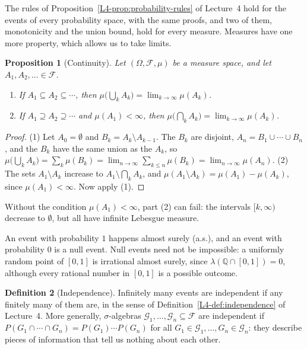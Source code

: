 \documentclass[11pt]{article}
\theoremstyle{definition}
\newtheorem{definition}{Definition}[section]
\theoremstyle{plain}
\newtheorem{proposition}[definition]{Proposition}
\theoremstyle{remark}
\begin{document}
The rules of Proposition~\ref{L4-prop:probability-rules} of Lecture~4 hold for the events of every probability space, with the same proofs, and two of them, monotonicity and the union bound, hold for every measure. Measures have one more property, which allows us to take limits.

\begin{proposition}[Continuity]\label{prop:continuity}
    Let $(\Omega, \mathcal{F}, \mu)$ be a measure space, and let $A_1, A_2, \ldots \in \mathcal{F}$.
    \begin{enumerate}
        \item If $A_1 \subseteq A_2 \subseteq \cdots$, then $\mu\big(\bigcup_k A_k\big) = \lim_{k \to \infty} \mu(A_k)$.
        \item If $A_1 \supseteq A_2 \supseteq \cdots$ and $\mu(A_1) < \infty$, then $\mu\big(\bigcap_k A_k\big) = \lim_{k \to \infty} \mu(A_k)$.
    \end{enumerate}
\end{proposition}

\begin{proof}
    (1) Let $A_0 = \emptyset$ and $B_k = A_k \setminus A_{k-1}$. The $B_k$ are disjoint, $A_n = B_1 \cup \cdots \cup B_n$, and the $B_k$ have the same union as the $A_k$, so $\mu\big(\bigcup_k A_k\big) = \sum_k \mu(B_k) = \lim_{n \to \infty}\sum_{k \leq n} \mu(B_k) = \lim_{n \to \infty} \mu(A_n)$. (2) The sets $A_1 \setminus A_k$ increase to $A_1 \setminus \bigcap_k A_k$, and $\mu(A_1 \setminus A_k) = \mu(A_1) - \mu(A_k)$, since $\mu(A_1) < \infty$. Now apply (1).
\end{proof}

Without the condition $\mu(A_1) < \infty$, part (2) can fail: the intervals $[k, \infty)$ decrease to $\emptyset$, but all have infinite Lebesgue measure.

An event with probability $1$ happens almost surely (a.s.), and an event with probability $0$ is a null event. Null events need not be impossible: a uniformly random point of $[0, 1]$ is irrational almost surely, since $\lambda(\mathbb{Q} \cap [0, 1]) = 0$, although every rational number in $[0, 1]$ is a possible outcome.

\begin{definition}[Independence]\label{def:independence}
    Infinitely many events are independent if any finitely many of them are, in the sense of Definition~\ref{L4-def:independence} of Lecture~4. More generally, $\sigma$-algebras $\mathcal{G}_1, \ldots, \mathcal{G}_n \subseteq \mathcal{F}$ are independent if $P(G_1 \cap \cdots \cap G_n) = P(G_1)\cdots P(G_n)$ for all $G_1 \in \mathcal{G}_1, \ldots, G_n \in \mathcal{G}_n$: they describe pieces of information that tell us nothing about each other.
\end{definition}
\end{document}
